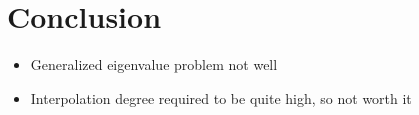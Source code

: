 \chapter{Conclusion}
\label{chp:6-conclusion}

\begin{itemize}
    \item Generalized eigenvalue problem not well
    \item Interpolation degree required to be quite high, so not worth it
\end{itemize}